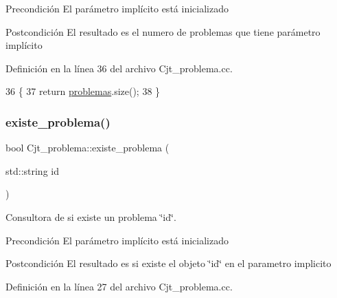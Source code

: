 \begin{DoxyPrecond}{Precondición}
El parámetro implícito está inicializado 
\end{DoxyPrecond}
\begin{DoxyPostcond}{Postcondición}
El resultado es el numero de problemas que tiene parámetro implícito 
\end{DoxyPostcond}


Definición en la línea 36 del archivo Cjt\+\_\+problema.\+cc.


\begin{DoxyCode}
36                                 \{
37     \textcolor{keywordflow}{return} \mbox{\hyperlink{class_cjt__problema_a2d471986320805c5b27f8d14d486fca8}{problemas}}.size();
38 \}
\end{DoxyCode}
\mbox{\label{class_cjt__problema_a831be5b51e252520ee981b58d9ec00e9}} 
\subsubsection{\texorpdfstring{existe\+\_\+problema()}{existe\_problema()}}
{\footnotesize\ttfamily bool Cjt\+\_\+problema\+::existe\+\_\+problema (\begin{DoxyParamCaption}\item[{std\+::string}]{id }\end{DoxyParamCaption})}



Consultora de si existe un problema \char`\"{}id\char`\"{}. 

\begin{DoxyPrecond}{Precondición}
El parámetro implícito está inicializado 
\end{DoxyPrecond}
\begin{DoxyPostcond}{Postcondición}
El resultado es si existe el objeto \char`\"{}id\char`\"{} en el parametro implicito 
\end{DoxyPostcond}


Definición en la línea 27 del archivo Cjt\+\_\+problema.\+cc.


